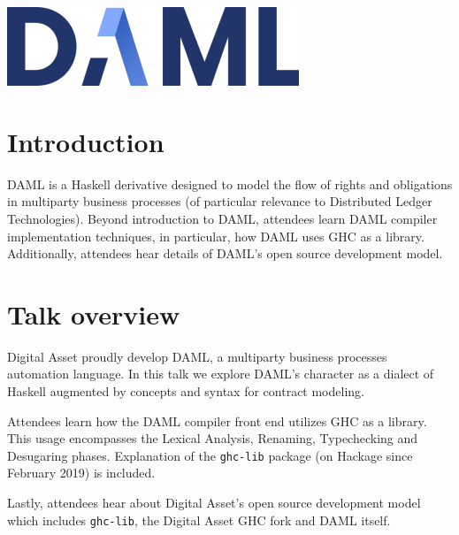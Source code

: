 \documentclass[acmsmall]{acmart}
\begin{document}
%
\begin{teaserfigure}
\includegraphics{img/DAML_330x89}
\label{fig:teaser}
\end{teaserfigure}

%
\maketitle

\section{Introduction}
DAML is a Haskell derivative designed to model the flow of rights and obligations in multiparty business processes (of particular relevance to Distributed Ledger Technologies). Beyond introduction to DAML, attendees learn DAML compiler implementation techniques, in particular, how DAML uses GHC as a library. Additionally, attendees hear details of DAML's open source development model.

\section{Talk overview}
Digital Asset proudly develop DAML, a multiparty business processes automation language. In this talk we explore DAML's character as a dialect of Haskell augmented by concepts and syntax for contract modeling.

Attendees learn how the DAML compiler front end utilizes GHC as a library. This usage encompasses the Lexical Analysis, Renaming, Typechecking and Desugaring phases. Explanation of the \verb|ghc-lib| package (on Hackage since February 2019) is included.

Lastly, attendees hear about Digital Asset's open source development model which includes \verb|ghc-lib|, the Digital Asset GHC fork and DAML itself.
\end{document}
